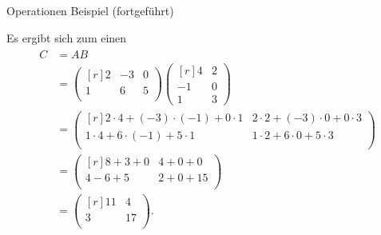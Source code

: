 \documentclass[
  8pt,
  ignorenonframetext,
]{beamer}
\begin{document}
\begin{frame}{Operationen}
\protect\hypertarget{operationen-16}{}
Beispiel (fortgeführt)

\small
\justifying

Es ergibt sich zum einen \begin{align}
\begin{split}
C
& = AB
\\
& = \begin{pmatrix*}[r]
2 & -3 & 0 \\
1 &  6 & 5 \\
\end{pmatrix*}
\begin{pmatrix*}[r]
4  & 2 \\
-1 & 0 \\
1  & 3
\end{pmatrix*}
\\
& =
\begin{pmatrix*}[r]
2\cdot 4 + (-3)\cdot (-1) + 0\cdot 1 & 2\cdot 2 + (-3)\cdot 0 + 0\cdot 3 \\
1\cdot 4 +    6\cdot (-1) + 5\cdot 1 & 1\cdot 2 +  6\cdot 0 + 5\cdot 3 \\
\end{pmatrix*}
\\
& =
\begin{pmatrix*}[r]
8 + 3 + 0 & 4 + 0 + 0 \\
4 - 6 + 5 & 2 + 0 + 15 \\
\end{pmatrix*}
\\
& =
\begin{pmatrix*}[r]
11 & 4 \\
3 & 17 \\
\end{pmatrix*}.
\end{split}
\end{align}
\end{frame}
\end{document}
